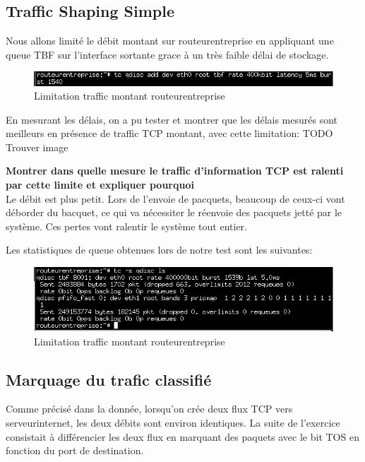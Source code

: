 \documentclass{article}
\begin{document}
\subsection{Traffic Shaping Simple}
Nous allons limité le débit montant sur routeurentreprise en appliquant une queue TBF sur l'interface sortante grace à un très faible délai de stockage.
\begin{figure}[h]
  \centering
  \includegraphics[width=\linewidth]{./captures/11-limite.png}
  \caption{Limitation traffic montant routeurentreprise}
  \label{fig:token-bucket}
\end{figure}

En mesurant les délais, on a pu tester et montrer que les délais mesurés sont meilleurs en présence de traffic TCP montant, avec cette limitation:
TODO Trouver image

\textbf{Montrer dans quelle mesure le traffic d'information TCP est ralenti par cette limite et expliquer pourquoi}\\
Le débit est plus petit. Lors de l'envoie de pacquets, beaucoup de ceux-ci vont déborder du bacquet, ce qui va nécessiter le réenvoie des pacquets jetté par le système. Ces pertes vont ralentir le système tout entier.

Les statistiques de queue obtenues lors de notre test sont les suivantes:
\begin{figure}[h]
  \centering
  \includegraphics[width=\linewidth]{./captures/13-stat-queue.png}
  \caption{Limitation traffic montant routeurentreprise}
  \label{fig:token-bucket}
\end{figure}

\subsection{Marquage du trafic classifié}

Comme précisé dans la donnée, lorsqu'on crée deux flux TCP vers serveurinternet, les deux débits sont environ identiques. La suite de l'exercice consistait à différencier les deux flux en marquant des paquets avec le bit TOS en fonction du port de destination.\\
\end{document}
